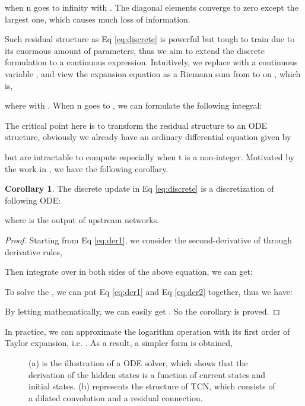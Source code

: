 \documentclass[sigconf]{acmart}
\theoremstyle{definition}
\newtheorem{corollary}{Corollary}
\begin{document}
when n goes to infinity with . The diagonal elements converge to zero except the largest one, which causes much loss of information.

Such residual structure as Eq \ref{eq:discrete} is powerful but tough to train due to its enormous amount of parameters, thus we aim to extend the discrete formulation to a continuous expression. Intuitively, we replace  with a continuous variable , and view the expansion equation as a Riemann sum from  to  on , which is,

where  with . When n goes to , we can formulate the following integral:


The critical point here is to transform the residual structure to an ODE structure, obviously we already have an ordinary differential equation given by

but  are intractable to compute especially when t is a non-integer. Motivated by the work in \cite{xhonneux2020continuous}, we have the following corollary.
\begin{corollary}
  The discrete update in Eq \ref{eq:discrete} is a discretization of following ODE:

where  is the output of upstream networks.
\end{corollary}

\begin{proof}
  Starting from Eq \ref{eq:der1}, we consider the second-derivative of  through derivative rules,
  
  Then integrate over  in both sides of the above equation, we can get:
  
  To solve the , we can put Eq \ref{eq:der1} and Eq \ref{eq:der2} together, thus we have:
  
  By letting  mathematically, we can easily get . So the corollary is proved.
\end{proof}
In practice, we can approximate the logarithm operation with its first order of Taylor expansion, i.e. . As a result, a simpler form is obtained,


\begin{figure}[htbp]
  \centering
  \caption{(a) is the illustration of a ODE solver, which shows that the derivation of the hidden states is a function of current states and initial states. (b) represents the structure of TCN, which consists of a dilated convolution and a residual connection.}
\end{figure}
\end{document}
